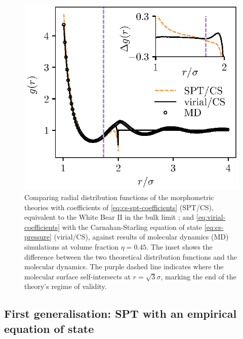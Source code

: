 \documentclass[11pt,twoside]{report}
\begin{document}
\begin{figure}
  \includegraphics[width=0.9\linewidth,outer]{g2-phi045}
  \caption{Comparing radial distribution functions of the morphometric theories with coefficients of \eqref{eq:cs-spt-coefficients} (SPT/CS), equivalent to the White Bear II in the bulk limit \cite{Hansen-GoosJPCM2006}; and \eqref{eq:virial-coefficients} with the Carnahan-Starling equation of state \eqref{eq:cs-pressure} (virial/CS), against results of molecular dynamics (MD) simulations at volume fraction $\eta = 0.45$.
    The inset shows the difference between the two theoretical distribution functions and the molecular dynamics.
    The purple dashed line indicates where the molecular surface self-intersects at $r = \sqrt{3} \sigma$, marking the end of the theory's regime of validity.}
  \label{fig:g2-full}
\end{figure}

\subsection{First generalisation: SPT with an empirical equation of state}
\label{sec:cs-spt}
\end{document}
